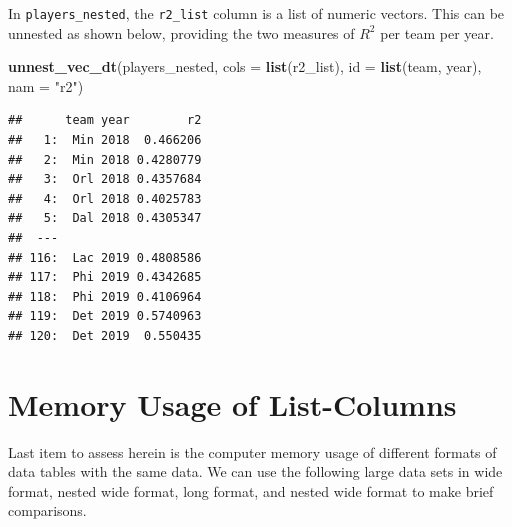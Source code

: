 \documentclass[doc,floatsintext]{apa6}
\newenvironment{Shaded}{\begin{snugshade}}{\end{snugshade}}
\newcommand{\DataTypeTok}[1]{\textcolor[rgb]{0.13,0.29,0.53}{#1}}
\newcommand{\KeywordTok}[1]{\textcolor[rgb]{0.13,0.29,0.53}{\textbf{#1}}}
\newcommand{\NormalTok}[1]{#1}
\newcommand{\StringTok}[1]{\textcolor[rgb]{0.31,0.60,0.02}{#1}}
\begin{document}
In \texttt{players\_nested}, the \texttt{r2\_list} column is a list of numeric vectors. This can be unnested as shown below, providing the two measures of \(R^2\) per team per year.

\begin{Shaded}
\begin{Highlighting}[]
\KeywordTok{unnest_vec_dt}\NormalTok{(players_nested, }
              \DataTypeTok{cols =} \KeywordTok{list}\NormalTok{(r2_list), }
              \DataTypeTok{id =} \KeywordTok{list}\NormalTok{(team, year), }
              \DataTypeTok{nam =} \StringTok{"r2"}\NormalTok{)}
\end{Highlighting}
\end{Shaded}

\begin{verbatim}
##      team year        r2
##   1:  Min 2018  0.466206
##   2:  Min 2018 0.4280779
##   3:  Orl 2018 0.4357684
##   4:  Orl 2018 0.4025783
##   5:  Dal 2018 0.4305347
##  ---                    
## 116:  Lac 2019 0.4808586
## 117:  Phi 2019 0.4342685
## 118:  Phi 2019 0.4106964
## 119:  Det 2019 0.5740963
## 120:  Det 2019  0.550435
\end{verbatim}

\hypertarget{memory-usage-of-list-columns}{%
\section{Memory Usage of List-Columns}\label{memory-usage-of-list-columns}}

Last item to assess herein is the computer memory usage of different formats of data tables with the same data. We can use the following large data sets in wide format, nested wide format, long format, and nested wide format to make brief comparisons.
\end{document}
